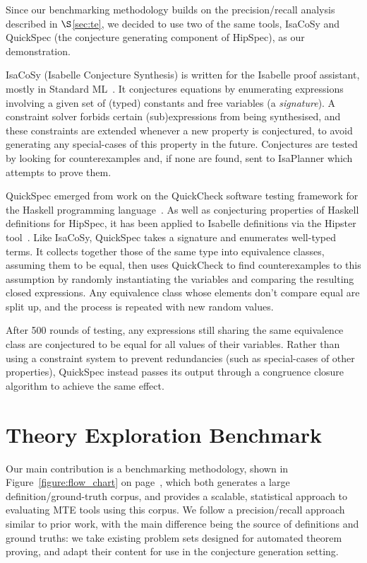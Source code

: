 Since our benchmarking methodology builds on the precision/recall analysis
described in $\S$\ref{sec:te}, we decided to use two of the same tools, IsaCoSy
and QuickSpec (the conjecture generating component of HipSpec), as our
demonstration.

IsaCoSy (Isabelle Conjecture Synthesis) is written for the Isabelle proof
assistant, mostly in Standard
ML~\cite{Johansson.Dixon.Bundy:conjecture-generation}. It conjectures equations
by enumerating expressions involving a given set of (typed) constants and free
variables (a \emph{signature}). A constraint solver forbids certain
(sub)expressions from being synthesised, and these constraints are extended
whenever a new property is conjectured, to avoid generating any special-cases of
this property in the future. Conjectures are tested by looking for
counterexamples and, if none are found, sent to IsaPlanner which attempts to
prove them.

QuickSpec emerged from work on the QuickCheck software testing framework for the
Haskell programming language~\cite{claessen2011quickcheck}. As well as
conjecturing properties of Haskell definitions for HipSpec, it has been applied
to Isabelle definitions via the Hipster tool~\cite{Hipster}. Like IsaCoSy,
QuickSpec takes a signature and enumerates well-typed terms. It collects
together those of the same type into equivalence classes, assuming them to be
equal, then uses QuickCheck to find counterexamples to this assumption by
randomly instantiating the variables and comparing the resulting closed
expressions. Any equivalence class whose elements don't compare equal are split
up, and the process is repeated with new random values.

After 500 rounds of testing, any expressions still sharing the same equivalence
class are conjectured to be equal for all values of their variables. Rather than
using a constraint system to prevent redundancies (such as special-cases of
other properties), QuickSpec instead passes its output through a congruence
closure algorithm to achieve the same effect.

\section{Theory Exploration Benchmark}
\label{sec:proposal}

Our main contribution is a benchmarking methodology, shown in
Figure~\ref{figure:flow_chart} on page~\pageref{figure:flow_chart}, which both
generates a large definition/ground-truth corpus, and provides a scalable,
statistical approach to evaluating MTE tools using this corpus. We follow a
precision/recall approach similar to prior work, with the main difference being
the source of definitions and ground truths: we take existing problem sets
designed for automated theorem proving, and adapt their content for use in the
conjecture generation setting.

